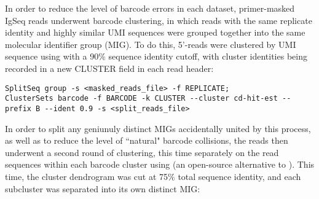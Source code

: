%

In order to reduce the level of barcode errors in each dataset, primer-masked IgSeq reads underwent barcode clustering, in which reads with the same replicate identity and highly similar UMI sequences were grouped together into the same molecular identifier group (MIG). To do this, 5'-reads were clustered by UMI sequence using   \parencite{li2006cdhit,fu2012cdhit} with a 90\% sequence identity cutoff, with cluster identities being recorded in a new CLUSTER field in each read header:

\begin{lstlisting}
SplitSeq group -s <masked_reads_file> -f REPLICATE;
ClusterSets barcode -f BARCODE -k CLUSTER --cluster cd-hit-est --prefix B --ident 0.9 -s <split_reads_file>
\end{lstlisting}

In order to split any geniunuly distinct MIGs accidentally united by this process, as well as to reduce the level of ``natural" barcode collisions, the reads then underwent a second round of clustering, this time separately on the read sequences within each barcode cluster using  (an open-source alternative to  \parencite{edgar2010usearch,rognes2016vsearch}).
This time, the cluster dendrogram was cut at 75\% total sequence identity, and each subcluster was separated into its own distinct MIG:

